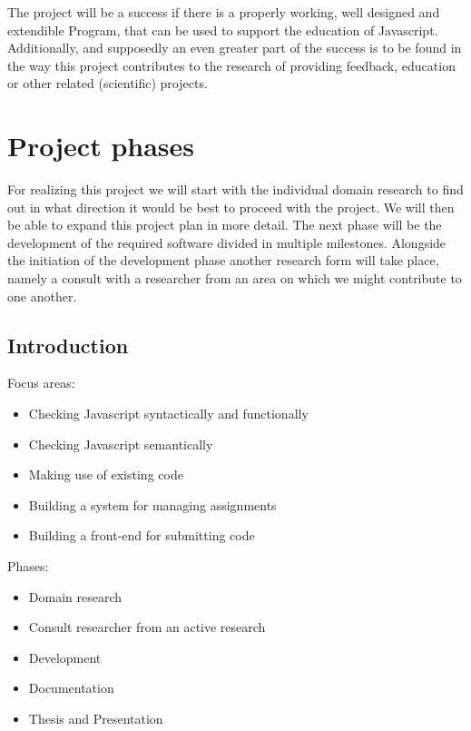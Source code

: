 \documentclass{article}
\begin{document}
The project will be a success if there is a properly working, well designed and extendible Program, that can be used to support the education of Javascript. Additionally, and supposedly an even greater part of the success is to be found in the way this project contributes to the research of providing feedback, education or other related (scientific) projects.

\section{Project phases}


For realizing this project we will start with the individual domain research to find out in what direction it would be best to proceed with the project. We will then be able to expand this project plan in more detail. The next phase will be the development of the required software divided in multiple milestones. Alongside the initiation of the development phase another research form will take place, namely a consult with a researcher from an area on which we might contribute to one another.

\subsection{Introduction}


Focus areas:
\begin{itemize}
  \item Checking Javascript syntactically and functionally
  \item Checking Javascript semantically
  \item Making use of existing code
  \item Building a system for managing assignments
  \item Building a front-end for submitting code
\end{itemize}

Phases:
\begin{itemize}
  \item Domain research
  \item Consult researcher from an active research
  \item Development
  \item Documentation
  \item Thesis and Presentation
\end{itemize}
\end{document}
